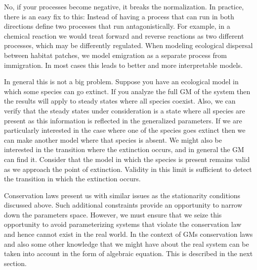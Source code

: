 \documentclass{article}
\begin{document}
No, if your processes become negative, it breaks the normalization. In practice, there is an easy fix to this: Instead of having a process that can run in both directions define two processes that run antagonistically. For example, in a chemical reaction we would treat forward and reverse reactions as two different processes, which may be differently regulated. When modeling ecological dispersal between habitat patches, we model emigration as a separate process from immigration. In most cases this leads to better and more interpretable models. \vspace{2mm}

In general this is not a big problem. Suppose you have an ecological model in which some species can go extinct. If you analyze the full GM of the system then the results will apply to steady states where all species coexist. Also, we can verify that the steady states under consideration is a state where all species are present as this information is reflected in the generalized parameters. If we are particularly interested in the case where one of the species goes extinct then we can make another model where that species is absent. We might also be interested in the transition where the extinction occurs, and in general the GM can find it. Consider that the model in which the species is present remains valid as we approach the point of extinction. Validity in this limit is sufficient to detect the transition in which the extinction occurs. \vspace{2mm}  

Conservation laws present us with similar issues as the stationarity conditions discussed above. Such additional constraints provide an opportunity to narrow down the parameters space. However, we must ensure that we seize this opportunity to avoid parameterizing systems that violate the conservation law and hence cannot exist in the real world. In the context of GMs conservation laws and also some other knowledge that we might have about the real system can be taken into account in the form of algebraic equation. This is described in the next section.  

\end{document}
